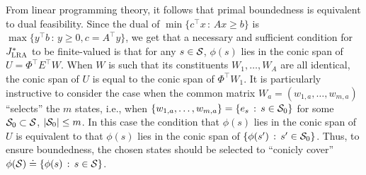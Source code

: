 From linear programming theory, it follows that primal boundedness is equivalent to dual feasibility. 
Since the dual of $\min\{c^\top x\,:\, Ax \ge b \}$ is 
$\max\{ y^\top b\,:\, y \ge 0, c = A^\top y\}$, we get
that a necessary and sufficient condition for $\Jlro$ 
to be finite-valued is that for any $s\in \S$, $\phi(s)$ lies in the conic span of $U = \Phi^\top E^\top W$.
When $W$ is such that its constituents $W_1,\dots,W_A$ are all identical, 
the conic span of $U$ is equal to the conic span of $\Phi^\top W_1$. 
It is particularly instructive 
to consider the case when the common matrix $W_a = (w_{1,a},\dots,w_{m,a})$ ``selects'' the $m$ states,
i.e., when $\{w_{1,a},\dots,w_{m,a}\}= \{ e_{s}\,:\, s\in \S_0 \}$ for some $\S_0\subset \S$, $|\S_0|\le m$.
In this case the condition that $\phi(s)$ lies in the conic span of $U$ is equivalent to that $\phi(s)$ lies in the conic
span of $\{\phi(s')\,:\, s'\in \S_0\}$. 
Thus, to ensure boundedness, 
the chosen states should be selected to ``conicly cover'' $\phi(\S)\doteq \{\phi(s)\,:\,s\in \S\}$.


